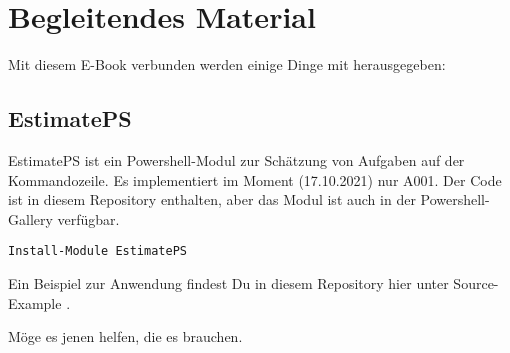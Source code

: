 \section{Begleitendes Material}

Mit diesem E-Book verbunden werden einige Dinge mit herausgegeben:


\subsection{EstimatePS}

EstimatePS ist ein Powershell-Modul zur Schätzung von Aufgaben auf der Kommandozeile. 
Es implementiert im Moment (17.10.2021) nur A001.
Der Code ist in diesem Repository enthalten, aber das Modul ist auch in der Powershell-Gallery verfügbar.

\begin{verbatim}
Install-Module EstimatePS
\end{verbatim}

Ein Beispiel zur Anwendung findest Du in diesem Repository hier unter Source\EstimatePS-Example .

Möge es jenen helfen, die es brauchen.


